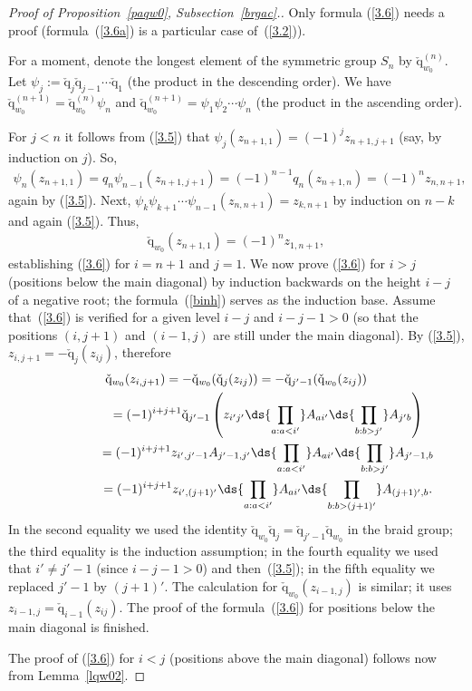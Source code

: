 \documentclass[11pt]{article}
\def\nplus{\mathfrak{n}}\def\nn{\nonumber}\def\nin{\noindent}
\def\q{\check{\mathrm q}}\def\Q{\mathrm{Q}}\def\r#1{(\ref{#1})}\let\rf=\r
\def\s{z}\def\S{\mathrm {S}}\def\si{\sigma}\def\Sp{\S^{\nplus}}\def\sy{\acute{\sigma}}\def\th{\mathring{h}}
\def\tphi{A}\def\tpsi{A'}\def\tphiplus{B}\def\tpsiminus{B'}\def\ttphi{B}\def\ttpsi{B'}\def\ts{\hskip1pt}\def\tts{\hskip.5pt}
\numberwithin{equation}{section}
\begin{document}
\begin{proof}[Proof  of Proposition~\ref{paqw0}, Subsection~\ref{brgac}.] %
Only formula \rf{3.6} needs a proof (formula~\rf{3.6a}
is a particular case of~\rf{3.2}).


For a moment, denote the longest element
of the symmetric group $S_n$ by $\q_{w_0}^{(n)}$. Let $\psi_j:=\q_j\q_{j-1}\cdots\q_1$ (the product in the descending order).
We have $\q_{w_0}^{(n+1)}=\q_{w_0}^{(n)}\psi_n$ and  $\q_{w_0}^{(n+1)}=\psi_1\psi_2\cdots\psi_n$ (the product in the
ascending order).


For $j<n$ it follows from \rf{3.5} that $\psi_j (\s_{n+1,1})=(-1)^j\s_{n+1,j+1}$ (say, by induction on $j$). So,
\begin{gather*}\psi_n(\s_{n+1,1})=q_n\psi_{n-1} (\s_{n+1,j+1})=(-1)^{n-1}q_n(\s_{n+1,n})=(-1)^{n}\s_{n,n+1}  ,\end{gather*}
again by \rf{3.5}. Next, $\psi_k\psi_{k+1}\cdots\psi_{n-1}(\s_{n,n+1})=\s_{k,n+1}$ by induction on $n-k$ and
again \rf{3.5}. Thus,
\begin{gather}\label{binh}
\q_{w_0}(\s_{n+1,1})=(-1)^n \s_{1,n+1} ,
\end{gather}
establishing \rf{3.6} for $i=n+1$ and $j=1$. We now prove \rf{3.6} for $i>j$ (positions below the main diagonal) by induction backwards
on the height $i-j$ of a negative root;  the formula~\rf{binh} serves as the induction base. Assume that~\rf{3.6}
is verif\/ied for a given level $i-j$ and $i-j-1>0$ (so that the positions $(i,j+1)$ and $(i-1,j)$ are still under the main
diagonal). By \rf{3.5}, $\s_{i,j+1}=-\q_j(\s_{ij})$, therefore
\begin{gather*}\q_{w_0}(\s_{i,j+1}) = -\q_{w_0}(\q_j(\s_{ij}))=-\q_{j'-1}(\q_{w_0}(\s_{ij})) \\
\phantom{\q_{w_0}(\s_{i,j+1})}{}  = (-1)^{i+j+1} \q_{j'-1}\left(\s_{i'j'}\ds{\prod_{a:a<i'}}\tphi_{ai'}  \ds{\prod_{b:b>j'}}\tphi_{j'b}\right)\\
\phantom{\q_{w_0}(\s_{i,j+1})}{} = (-1)^{i+j+1}\s_{i',j'-1}\tphi_{j'-1,j'}\ds{\prod_{a:a<i'}}\tphi_{ai'}  \ds{\prod_{b:b>j'}}\tphi_{j'-1,b}\\
\phantom{\q_{w_0}(\s_{i,j+1})}{} = (-1)^{i+j+1}\s_{i',(j+1)'}\ds{\prod_{a:a<i'}}\tphi_{ai'}\ds{\prod_{b:b>(j+1)'}}\tphi_{(j+1)',b}  .
\end{gather*}
In the second equality we used the identity $\q_{w_0}\q_j=\q_{j'-1}\q_{w_0}$ in the braid group; the third equality is the
induction assumption; in the fourth equality we used that $i'\neq j'-1$ (since $i-j-1>0$) and then~\rf{3.5}; in the f\/ifth equality we
replaced $j'-1$ by $(j+1)'$. The calculation for $\q_{w_0}(\s_{i-1,j})$ is similar; it uses $\s_{i-1,j}=\q_{i-1}(\s_{ij})$.
The proof of the formula~\rf{3.6} for positions below the main diagonal is f\/inished.


The proof of  \rf{3.6} for $i<j$ (positions above the main diagonal) follows now from Lem\-ma~\ref{lqw02}. %
\end{proof}
\end{document}
